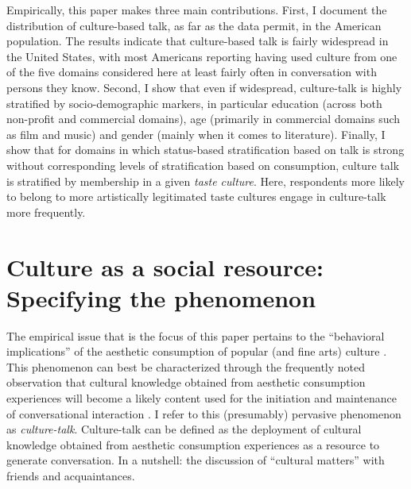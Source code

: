 \documentclass[11pt]{article}
\begin{document}
Empirically, this paper makes three main contributions.  First, I document the distribution of culture-based talk, as far as the data permit, in the American population.  The results indicate that culture-based talk is fairly widespread in the United States, with most Americans reporting having used culture from one of the five domains considered here at least fairly often in conversation with persons they know.  Second, I show that even if widespread, culture-talk is highly stratified by socio-demographic markers, in particular education (across both non-profit and commercial domains), age (primarily in commercial domains such as film and music) and gender (mainly when it comes to literature). Finally, I show that for domains in which status-based stratification based on talk is strong without corresponding levels of stratification based on consumption, culture talk is stratified by membership in a given \emph{taste culture}.  Here, respondents more likely to belong to more artistically legitimated taste cultures engage in culture-talk more frequently.

\section{Culture as a social resource:  Specifying the phenomenon}
The empirical issue that is the focus of this paper pertains to the ``behavioral implications'' of the aesthetic consumption of popular (and fine arts) culture \citep{fine77}.  This phenomenon can best be characterized through the frequently noted observation that cultural knowledge obtained from aesthetic consumption experiences will become a likely content used for the initiation and maintenance of conversational interaction \citep{dimaggio87, collins75}.  I refer to this (presumably) pervasive phenomenon as \emph{culture-talk}.  Culture-talk can be defined as the deployment of cultural knowledge obtained from aesthetic consumption experiences as a resource to generate conversation.  In a nutshell:  the discussion of ``cultural matters'' with friends and acquaintances.
\end{document}

